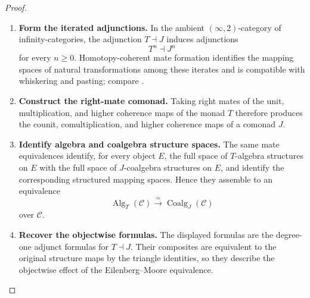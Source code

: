 \begin{proof}
\leavevmode
\begin{enumerate}[label=\textup{(\arabic*)}]
    \item \textbf{Form the iterated adjunctions.}
In the ambient \((\infty,2)\)-category of infinity-categories, the adjunction
\(T\dashv J\) induces adjunctions
\[
  T^n\dashv J^n
\]
for every \(n\geq0\). Homotopy-coherent mate formation identifies the mapping
spaces of natural transformations among these iterates and is compatible with
whiskering and pasting; compare
\cite{LurieHTT,LurieHigherAlgebra}.

    \item \textbf{Construct the right-mate comonad.}
Taking right mates of the unit, multiplication, and higher coherence maps of
the monad \(T\) therefore produces the counit, comultiplication, and higher
coherence maps of a comonad \(J\).

    \item \textbf{Identify algebra and coalgebra structure spaces.}
The same mate equivalences identify, for
every object \(E\), the full space of \(T\)-algebra structures on \(E\) with the
full space of \(J\)-coalgebra structures on \(E\), and identify the corresponding
structured mapping spaces. Hence they assemble to an equivalence
\[
  \operatorname{Alg}_T(\mathcal C)
  \xrightarrow{\simeq}
  \operatorname{Coalg}_J(\mathcal C)
\]
over \(\mathcal C\).

    \item \textbf{Recover the objectwise formulas.}
The displayed formulas are the degree-one adjunct formulas for
\(T\dashv J\). Their composites are equivalent to the original structure maps
by the triangle identities, so they describe the objectwise effect of the
Eilenberg--Moore equivalence.
\end{enumerate}
\end{proof}

